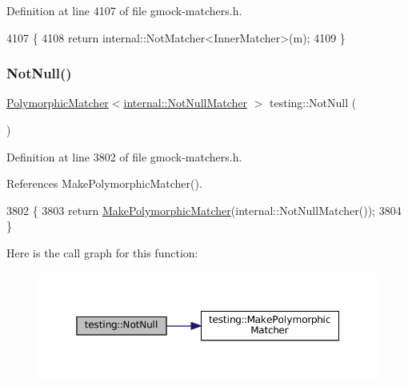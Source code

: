 Definition at line 4107 of file gmock-\/matchers.\+h.


\begin{DoxyCode}
4107                                                             \{
4108   \textcolor{keywordflow}{return} internal::NotMatcher<InnerMatcher>(m);
4109 \}
\end{DoxyCode}
\mbox{\label{namespacetesting_a39d1f92b53b8b2a0b6db6a22ac146416}} 
\subsubsection{\texorpdfstring{Not\+Null()}{NotNull()}}
{\footnotesize\ttfamily \hyperlink{classtesting_1_1PolymorphicMatcher}{Polymorphic\+Matcher}$<$\hyperlink{classtesting_1_1internal_1_1NotNullMatcher}{internal\+::\+Not\+Null\+Matcher} $>$ testing\+::\+Not\+Null (\begin{DoxyParamCaption}{ }\end{DoxyParamCaption})\hspace{0.3cm}{\ttfamily [inline]}}



Definition at line 3802 of file gmock-\/matchers.\+h.



References Make\+Polymorphic\+Matcher().


\begin{DoxyCode}
3802                                                              \{
3803   \textcolor{keywordflow}{return} \hyperlink{namespacetesting_a667ca94f190ec2e17ee2fbfdb7d3da04}{MakePolymorphicMatcher}(internal::NotNullMatcher());
3804 \}
\end{DoxyCode}
Here is the call graph for this function\+:
\nopagebreak
\begin{figure}[H]
\begin{center}
\leavevmode
\includegraphics[width=350pt]{namespacetesting_a39d1f92b53b8b2a0b6db6a22ac146416_cgraph}
\end{center}
\end{figure}
\mbox{\label{namespacetesting_a7c88897836b9f492190fb2b9dfa3a327}} 
